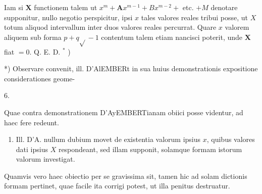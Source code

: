 \documentclass[10pt]{article}
\begin{document}
Iam si \(\boldsymbol{X}\) functionem talem ut \(x^{m}+\boldsymbol{A} x^{m-1}+B x^{m-2}+\) etc. \(+M\) denotare supponitur, nullo negotio perspicitur, ipsi \(x\) tales valores reales tribui posse, ut \(X\) totum aliquod intervallum inter duos valores reales percurrat. Quare \(x\) valorem aliquem sub forma \(p+q \sqrt{ }-1\) contentum talem etiam nancisci poterit, unde \(\boldsymbol{X}\) fiat \(=0\). Q. E. D. \({ }^{*}\) )

*) Observare convenit, ill. D'AlEMBERt in sua huius demonstrationis expositione considerationes geome-

6.

Quae contra demonstrationem D'AyEMBERTianam obiici posse videntur, ad haec fere redeunt.

\begin{enumerate}
  \item Ill. D'A. nullum dubium movet de existentia valorum ipsius \(x\), quibus valores dati ipsius \(X\) respondeant, sed illam supponit, solamque formam istorum valorum investigat.
\end{enumerate}

Quamvis vero haec obiectio per se gravissima sit, tamen hic ad solam dictionis formam pertinet, quae facile ita corrigi potest, ut illa penitus destruatur.
\end{document}
